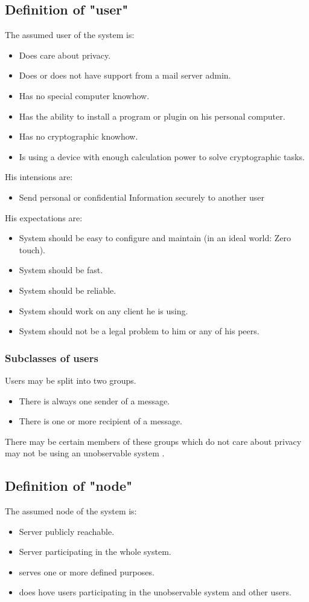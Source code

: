 \documentclass[12pt,journal,compsoc]{IEEEtran}
\begin{document}
\subsection{Definition of "user"}
The assumed user of the system is:
\begin{itemize}
	\item Does care about privacy.
	\item Does or does not have support from a mail server admin.
	\item Has no special computer knowhow.
	\item Has the ability to install a program or plugin on his personal computer.
	\item Has no cryptographic knowhow.
	\item Is using a device with enough calculation power to solve cryptographic tasks.
\end{itemize}
His intensions are:
\begin{itemize}
	\item Send personal or confidential Information securely to another user
\end{itemize}
His expectations are:
\begin{itemize}
	\item System should be easy to configure and maintain (in an ideal world: Zero touch). 
	\item System should be fast.
	\item System should be reliable.
	\item System should work on any client he is using.
	\item System should not be a legal problem to him or any of his peers.
\end{itemize}
\subsubsection{Subclasses of users} 
Users may be split into two groups.
\begin{itemize}
	\item There is always one sender of a message.
	\item There is one or more recipient of a message.
\end{itemize}
There may be certain members of these groups which do not care about privacy may not be using an unobservable system .

\subsection{Definition of "node"}
The assumed node of the system is:
\begin{itemize}
	\item Server publicly reachable.
	\item Server participating in the whole system.
	\item serves one or more defined purposes.
	\item does hove users participating in the unobservable system and other users.
\end{itemize}
\end{document}
